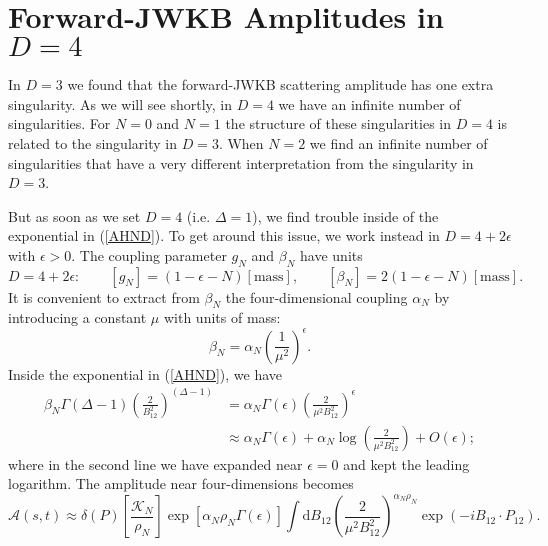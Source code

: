 \section{Forward-JWKB Amplitudes in $D = 4$\label{sec5}}
In $D = 3$ we found that the forward-JWKB scattering amplitude has one extra singularity. As we will see shortly, in $D = 4$ we have an infinite number of singularities. For $N = 0$ and $N = 1$ the structure of these singularities in $D = 4$ is related to the singularity in $D = 3$. When $N = 2$ we find an infinite number of singularities that have a very different interpretation from the singularity in $D = 3$.

But as soon as we set $D = 4$ (i.e. $\Delta = 1$), we find trouble inside of the exponential in (\ref{AHND}). To get around this issue, we work instead in $D = 4 + 2 \epsilon$ with $\epsilon > 0$. The coupling parameter $g_{N}$ and $\beta_{N}$ have units
\begin{equation}
	D = 4 + 2 \epsilon: \qquad [g_{N}] = \left( 1 - \epsilon - N \right) [\text{mass}], \qquad [\beta_{N}] = 2 \left( 1 - \epsilon - N \right) [\text{mass}].
\end{equation}
It is convenient to extract from $\beta_{N}$ the four-dimensional coupling $\alpha_{N}$ by introducing a constant $\mu$ with units of mass:
\begin{equation}
	\beta_{N} = \alpha_{N} \left( \frac{1}{\mu^{2}} \right)^{\epsilon}.
\end{equation}
Inside the exponential in (\ref{AHND}), we have
\begin{align}
	\beta_{N} \Gamma(\Delta - 1) \left( \frac{2}{B_{12}^{2}} \right)^{(\Delta - 1)} &= \alpha_{N} \Gamma(\epsilon) \left( \frac{2}{\mu^{2} B_{12}^{2}} \right)^{\epsilon} \nonumber \\
	&\approx \alpha_{N} \Gamma(\epsilon) + \alpha_{N} \log{\left( \frac{2}{\mu^{2} B_{12}^{2}} \right)} + O(\epsilon);
\end{align}
where in the second line we have expanded near $\epsilon = 0$ and kept the leading logarithm. The amplitude near four-dimensions becomes
\begin{equation}
	\mathcal{A}(s, t) \approx \delta(P) \left[ \frac{\mathcal{K}_{N}}{\rho_{N}} \right] \exp{\left[ \alpha_{N} \rho_{N} \Gamma(\epsilon) \right]} \int \mathrm{d}B_{12} \left( \frac{2}{\mu^{2} B_{12}^{2}} \right)^{\alpha_{N} \rho_{N}} \exp{\left( - i B_{12} \cdot P_{12} \right)}.
\end{equation}
